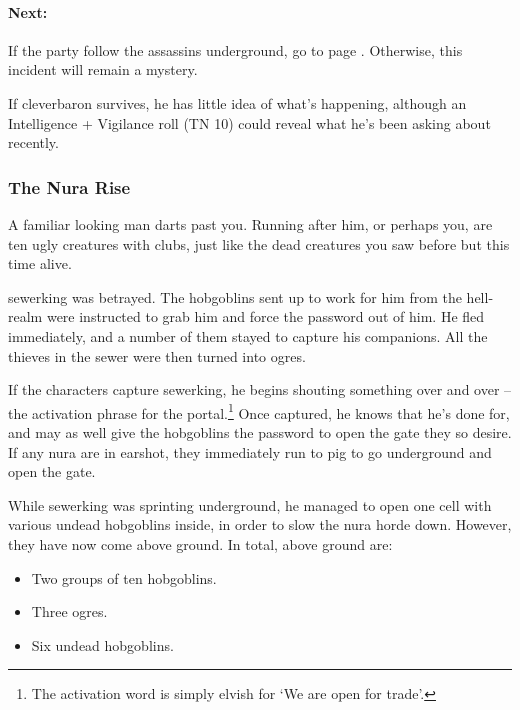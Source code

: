 \paragraph{Next:} If the party follow the assassins underground, go to page \pageref{sewers}.  Otherwise, this incident will remain a mystery.

If \gls{cleverbaron} survives, he has little idea of what's happening, although an Intelligence + Vigilance roll (TN 10) could reveal what he's been asking about recently.

\subsubsection{The Nura Rise}

\begin{speechtext}

	A familiar looking man darts past you.  Running after him, or perhaps you, are ten ugly creatures with clubs, just like the dead creatures you saw before but this time alive.

\end{speechtext}


\deephobgoblin

\Gls{sewerking} was betrayed.  The hobgoblins sent up to work for him from the hell-realm were instructed to grab him and force the password out of him.  He fled immediately, and a number of them stayed to capture his companions.  All the thieves in the sewer were then turned into ogres.

If the characters capture \gls{sewerking}, he begins shouting something over and over -- the activation phrase for the portal.\footnote{The activation word is simply elvish for `We are open for trade'.}  Once captured, he knows that he's done for, and may as well give the hobgoblins the password to open the gate they so desire.  If any nura are in earshot, they immediately run to \gls{pig} to go underground and open the gate.

While \gls{sewerking} was sprinting underground, he managed to open one cell with various undead hobgoblins inside, in order to slow the nura horde down.  However, they have now come above ground.  In total, above ground are:

\begin{itemize}

	\item{Two groups of ten hobgoblins.}
	\item{Three ogres.}
	\item{Six undead hobgoblins.}
\end{itemize}

